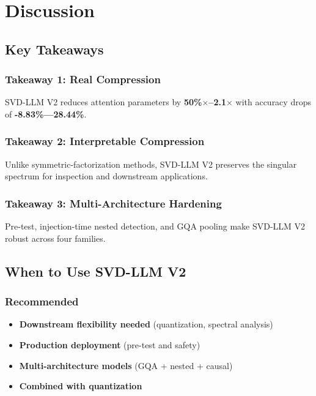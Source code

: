
\section{Discussion}

\subsection{Key Takeaways}

\subsubsection{Takeaway 1: Real Compression}

SVD-LLM V2 reduces attention parameters by \textbf{50\%$\times$--2.1$\times$} with 
accuracy drops of \textbf{-8.83\%---28.44\%}.

\subsubsection{Takeaway 2: Interpretable Compression}

Unlike symmetric-factorization methods, SVD-LLM V2 preserves the singular 
spectrum for inspection and downstream applications.

\subsubsection{Takeaway 3: Multi-Architecture Hardening}

Pre-test, injection-time nested detection, and GQA pooling make SVD-LLM V2 
robust across four families.

\subsection{When to Use SVD-LLM V2}

\subsubsection{Recommended}

\begin{itemize}
\item \textbf{Downstream flexibility needed} (quantization, spectral analysis)
\item \textbf{Production deployment} (pre-test and safety)
\item \textbf{Multi-architecture models} (GQA + nested + causal)
\item \textbf{Combined with quantization}

\end{itemize}

